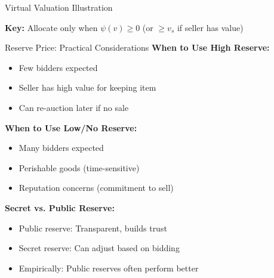 \documentclass[xcolor={x11names}, aspectratio=169 ]{beamer}
\begin{document}
\begin{frame}{Virtual Valuation Illustration}
\begin{center}
\end{center}

\textbf{Key:} Allocate only when $\psi(v) \geq 0$ (or $\geq v_s$ if seller has value)
\end{frame}

\begin{frame}{Reserve Price: Practical Considerations}
\textbf{When to Use High Reserve:}
\begin{itemize}
  \item Few bidders expected
  \item Seller has high value for keeping item
  \item Can re-auction later if no sale
\end{itemize}

\textbf{When to Use Low/No Reserve:}
\begin{itemize}
  \item Many bidders expected
  \item Perishable goods (time-sensitive)
  \item Reputation concerns (commitment to sell)
\end{itemize}

\textbf{Secret vs. Public Reserve:}
\begin{itemize}
  \item Public reserve: Transparent, builds trust
  \item Secret reserve: Can adjust based on bidding
  \item Empirically: Public reserves often perform better
\end{itemize}
\end{frame}
\end{document}

